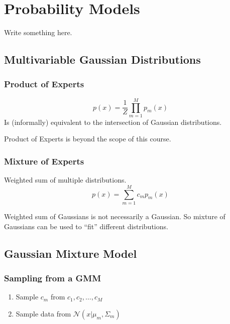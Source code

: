 \chapter{Probability Models}
Write something here.
\newpage
\section{Multivariable Gaussian Distributions}
\subsection{Product of Experts}
\[ p(x) = \frac{1}{Z}\prod_{m=1}^M p_m(x) \]
Is (informally) equivalent to the intersection of Gaussian distributions.
\begin{remark}
    Product of Experts is beyond the scope of this course.
\end{remark}
\subsection{Mixture of Experts}
Weighted sum of multiple distributions.
\[ p(x) = \sum_{m=1}^M c_m p_m(x) \]
\begin{remark}
    Weighted sum of Gaussians is not necessarily a Gaussian. So mixture of Gaussians can be used to ``fit'' different distributions.
\end{remark}

\section{Gaussian Mixture Model}
\subsection{Sampling from a GMM}
\begin{enumerate}
    \item Sample $c_m$ from $c_1,c_2,\dots,c_M$
    \item Sample data from $\mathcal{N}(x|\mu_m,\Sigma_m)$
\end{enumerate}

\section{Some Information Theory}
\textbf{Information} contains \textbf{uncertainty}. The more uncertain something is, the more information is needed to eliminate its uncertainty.

